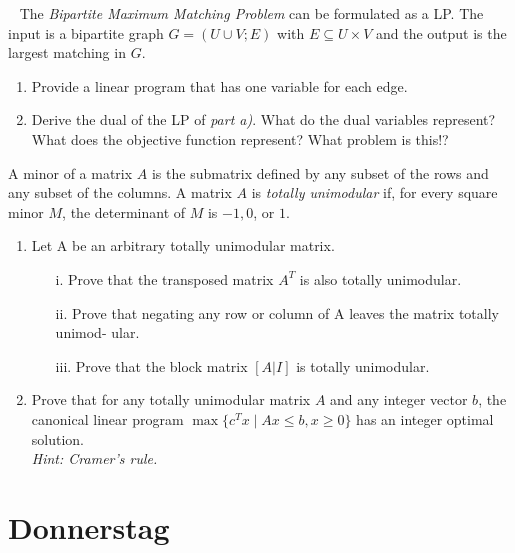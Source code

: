 \documentclass{uebung_cs}
\begin{document}
\begin{aufgabe}\
	The \emph{Bipartite Maximum Matching Problem} can be formulated as a \acs{LP}. The input is a bipartite graph $G=(U\cup V;E)$ with $E \subseteq U \times V$ and the output is the largest matching in $G$.
	\begin{enumerate}
		\item Provide a linear program that has one variable for each edge.
		\item Derive the dual of the \acs{LP} of \emph{part a)}. What do the dual variables represent? What does the objective function represent? What problem is this!?
	\end{enumerate}
\end{aufgabe}

\begin{aufgabe}
	A minor of a matrix $A$ is the submatrix defined by any subset of the rows and any subset of the columns. A matrix $A$ is \emph{totally unimodular} if, for every square minor $M$, the determinant of $M$ is $−1, 0$, or $1$.
	\begin{enumerate}
		\item Let A be an arbitrary totally unimodular matrix.
		\begin{itemize}
			\item[i.] Prove that the transposed matrix $A^T$ is also totally unimodular.
			\item[ii.] Prove that negating any row or column of A leaves the matrix totally unimod- ular.
			\item[iii.] Prove that the block matrix $[A | I ]$ is totally unimodular.
		\end{itemize}
		\item Prove that for any totally unimodular matrix $A$ and any integer vector $b$, the canonical linear program $\max\{c^T x  \; | \; Ax \leq b, x \geq 0\}$ has an integer optimal solution. \\
		\emph{Hint: Cramer’s rule.}
	\end{enumerate}
\end{aufgabe}

\section*{Donnerstag}
\end{document}
